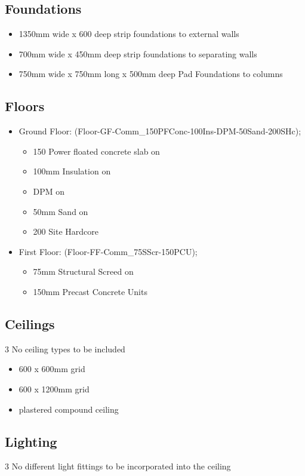 \subsection*{Foundations}
\begin{itemize}
	\item 1350mm wide x 600  deep strip foundations to external walls
	\item 700mm wide x 450mm deep strip foundations to separating walls
	\item 750mm wide x 750mm long x 500mm deep Pad Foundations to columns
\end{itemize}


\subsection*{Floors}
\begin{itemize}
	\item Ground Floor: (Floor-GF-Comm\_150PFConc-100Ins-DPM-50Sand-200SHc);
	\begin{itemize}
		\item 150 Power floated concrete slab on
		\item 100mm Insulation on
		\item DPM on 
		\item 50mm Sand on 
		\item 200 Site Hardcore
	\end{itemize}   
	\item First Floor: (Floor-FF-Comm\_75SScr-150PCU);
	\begin{itemize}
		\item 75mm Structural Screed on 
		\item 150mm Precast Concrete Units
	\end{itemize} 
\end{itemize}


\subsection*{Ceilings}
3 No ceiling types to be included
\begin{itemize}
	\item 600 x 600mm grid
	\item 600 x 1200mm grid
	\item plastered compound ceiling
\end{itemize}



\subsection*{Lighting}
3 No different light fittings to be incorporated into the ceiling


